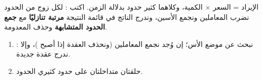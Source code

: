 \begin{statement}
الإيراد = السعر × الكمية، وكلاهما كثير حدود بدلالة الزمن. اكتب : لكل زوج من الحدود نضرب المعاملين ونجمع الأسين، وندرج الناتج في قائمة النتيجة \textbf{مرتبة تنازليًا} مع \textbf{جمع الحدود المتشابهة} وحذف المعدومة.
\end{statement}
\begin{stepsbox}\begin{enumerate}
\item {}: نبحث عن موضع الأس؛ إن وُجد نجمع المعاملين (ونحذف العقدة إذا أصبح )، وإلا ندرج عقدة جديدة.
\item حلقتان متداخلتان على حدود كثيري الحدود.
\end{enumerate}\end{stepsbox}
